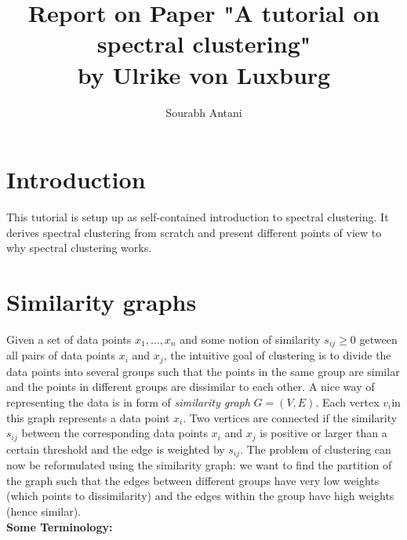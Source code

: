 \documentclass[10pt,a4paper, nocenter]{report}
\author{Sourabh Antani}
\title{Report on Paper "A tutorial on spectral clustering" \\by Ulrike von Luxburg}
\date{}
\begin{document}
	\maketitle
	\chapter*{Introduction}
	\thispagestyle{fancy}
	This tutorial is setup up as self-contained introduction to spectral clustering. It derives spectral clustering from scratch and present different points of view to why spectral clustering works. 
	
	\chapter*{Similarity graphs}
	\thispagestyle{fancy}
		Given a set of data points $x_{1},\dots,x_{n}$ and some notion of similarity $s_{ij}\ge 0$ getween all pairs of data points $x_{i}$ and $x_{j}$, the intuitive goal of clustering is to divide the data points into several groups such that the points in the same group are similar and the points in different groups are dissimilar to each other. A nice way of representing the data is in form of \textit{similarity graph} $G=(V,E)$. Each vertex $v_{i}$in this graph represents a data point $x_{i}$. Two vertices are connected if the similarity $s_{ij}$ between the corresponding data points $x_{i}$ and $x_{j}$ is positive or larger than a certain threshold and the edge is weighted by $s_{ij}$. The problem of clustering can now be reformulated using the similarity graph: we want to find the partition of the graph such that the edges between different groups have very low weights (which points to dissimilarity) and the edges within the group have high weights (hence similar). 
		\\
		\textbf{Some Terminology:}
\end{document}
